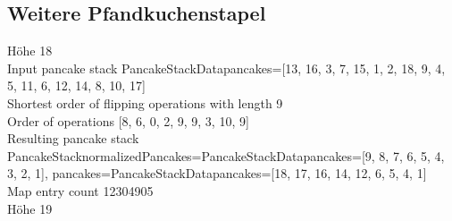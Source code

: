 \subsection{Weitere Pfandkuchenstapel}\label{subsec:weitere-pfandkuchenstapel}
Höhe 18 \\
Input pancake stack PancakeStackData{pancakes=[13, 16, 3, 7, 15, 1, 2, 18, 9, 4, 5, 11, 6, 12, 14, 8, 10, 17]} \\
Shortest order of flipping operations with length 9 \\
Order of operations [8, 6, 0, 2, 9, 9, 3, 10, 9] \\
Resulting pancake stack PancakeStack{normalizedPancakes=PancakeStackData{pancakes=[9, 8, 7, 6, 5, 4, 3, 2, 1]}, pancakes=PancakeStackData{pancakes=[18, 17, 16, 14, 12, 6, 5, 4, 1]}} \\
Map entry count 12304905 \\
Höhe 19 \\


